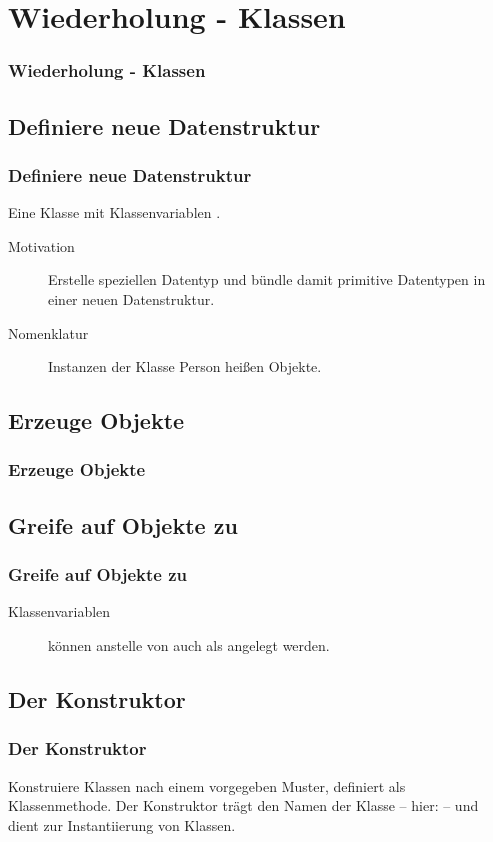 \def\stitle{Wiederholung - Klassen}
\section{\stitle}
\begin{frame}%
  \frametitle{\stitle}%
\tableofcontents[current]
\end{frame}


\def\sstitle{Definiere neue Datenstruktur}
\subsection{\sstitle}
\begin{frame}%
  \frametitle{\sstitle}%
Eine Klasse  mit Klassenvariablen .

\begin{description}
\item[Motivation]
Erstelle speziellen Datentyp  und b\"undle damit primitive Datentypen  in einer neuen Datenstruktur.
\item[Nomenklatur] Instanzen der Klasse Person hei\ss en Objekte.
\end{description}
\end{frame}


\def\sstitle{Erzeuge Objekte}
\subsection{\sstitle}
\begin{frame}%
  \frametitle{\sstitle}%

\end{frame}


\def\sstitle{Greife auf Objekte zu}
\subsection{\sstitle}
\begin{frame}%
  \frametitle{\sstitle}%

\begin{description}
\item[Klassenvariablen] k\"onnen anstelle von  auch als  angelegt werden.
\end{description}
\end{frame}


\def\sstitle{Der Konstruktor}
\subsection{\sstitle}
\begin{frame}%
  \frametitle{\sstitle}%
Konstruiere Klassen nach einem vorgegeben Muster, definiert als Klassenmethode.
Der Konstruktor tr\"agt den Namen der Klasse -- hier:  -- und dient zur Instantiierung von Klassen.

\end{frame}


